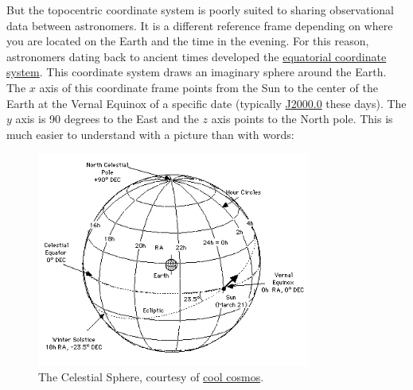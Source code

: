 But the topocentric coordinate system is poorly suited to sharing observational data between astronomers.
It is a different reference frame depending on where you are located on the Earth and the time in the evening.
For this reason, astronomers dating back to ancient times developed the \href{https://en.wikipedia.org/wiki/Equatorial_coordinate_system}{equatorial coordinate system}.
This coordinate system draws an imaginary sphere around the Earth.
The $x$ axis of this coordinate frame points from the Sun to the center of the Earth at the Vernal Equinox of a specific date 
(typically \href{https://en.wikipedia.org/wiki/Epoch_(astronomy)}{J2000.0} these days).
The $y$ axis is 90 degrees to the East and the $z$ axis points to the North pole.
This is much easier to understand with a picture than with words:
\begin{figure}[hbt!]
\begin{center}
\includegraphics[width=0.8\textwidth]{../figs/web/celestial_sphere.png}
\caption[The Celestial Sphere]
{The Celestial Sphere, courtesy of \href{http://coolcosmos.ipac.caltech.edu/cosmic_classroom/cosmic_reference/coordsys.html}{cool cosmos}.}
\end{center}
\end{figure}

